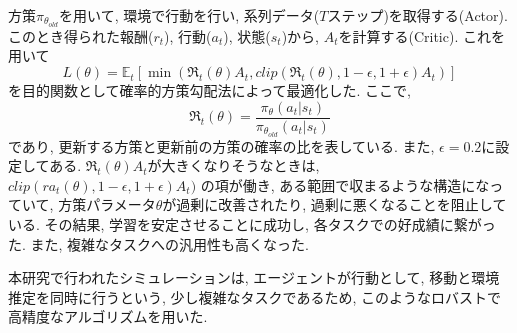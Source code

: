 \documentclass[../main]{subfiles}
\begin{document}
方策$\pi_{\theta_{old}}$を用いて,
環境で行動を行い, 系列データ($T$ステップ)を取得する(Actor).
このとき得られた報酬($r_t$), 行動($a_t$), 状態($s_t$)から, 
$A_t$を計算する(Critic).
これを用いて
\begin{equation}
\label{eq:lclip}
L(\theta) = \mathbb{E}_t[\min(\mathfrak{R}_t(\theta)A_t, 
  clip(\mathfrak{R}_t(\theta), 1-\epsilon, 1+\epsilon)A_t)]
\end{equation}
を目的関数として確率的方策勾配法によって最適化した.
ここで, 
\begin{equation}
\mathfrak{R}_t(\theta)=
\frac{\pi_\theta(a_t|s_t)}{\pi_{\theta_{old}}(a_t|s_t)}
\end{equation}
であり, 更新する方策と更新前の方策の確率の比を表している. 
また, $\epsilon=0.2$に設定してある.
$\mathfrak{R}_t(\theta)A_t$が大きくなりそうなときは, 
$clip(ra_t(\theta), 1-\epsilon, 1+\epsilon)A_t)$
の項が働き, ある範囲で収まるような構造になっていて, 
方策パラメータ$\theta$が過剰に改善されたり, 
過剰に悪くなることを阻止している.
その結果, 学習を安定させることに成功し, 
各タスクでの好成績に繋がった. 
また, 複雑なタスクへの汎用性も高くなった.

本研究で行われたシミュレーションは, 
エージェントが行動として, 
移動と環境推定を同時に行うという, 
少し複雑なタスクであるため,
このようなロバストで高精度なアルゴリズムを用いた.
\end{document}
